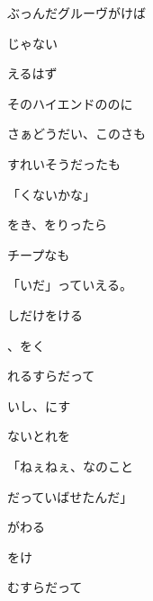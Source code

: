 \documentclass[a4paper,tate,twocolumn,12pt]{ltjtarticle}
\begin{document}
\begin{flushleft}
\begin{minipage}{\linewidth}
ぶっんだグルーヴがけば

じゃない

えるはず

そのハイエンドののに
\end{minipage}

\vspace{2em}

\noindent\begin{minipage}{\linewidth}
さぁどうだい、このさも

すれいそうだったも

「くないかな」

をき、をりったら

チープなも

「いだ」っていえる。

しだけをける
\end{minipage}

\vspace{2em}

\noindent\begin{minipage}{\linewidth}
、をく

れるすらだって

いし、にす

ないとれを

「ねぇねぇ、なのこと

だっていばせたんだ」

がわる
\end{minipage}

\vspace{2em}

\noindent\begin{minipage}{\linewidth}
をけ

むすらだって


\end{minipage}
\end{flushleft}
\end{document}
